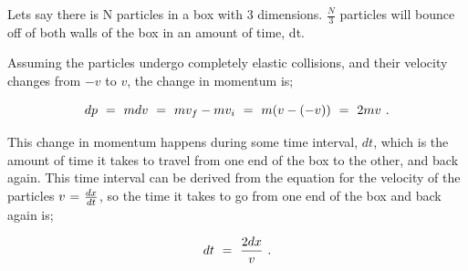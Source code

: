 \documentclass{article}
\begin{document}
Lets say there is N particles in a box with 3 dimensions. \begin{math} \frac{N}{3} \end{math} particles will bounce off of both walls of the box in an amount of time, dt. 

\vspace{0.25cm}

Assuming the particles undergo completely elastic collisions, and their velocity changes from \begin{math} -v \end{math} to \begin{math} v \end{math}, the change in momentum is;

\vspace{-0.25cm}

\begin{equation} \label{eb-eq-256-64}
dp \hspace{0.125cm} = \hspace{0.125cm} m dv \hspace{0.125cm} = \hspace{0.125cm} m v_f - m v_i \hspace{0.125cm} = \hspace{0.125cm} m (v - (-v)) \hspace{0.125cm} = \hspace{0.125cm} 2 m v \hspace{0.125cm} .
\end{equation}

This change in momentum happens during some time interval, \begin{math} dt \end{math}, which is the amount of time it takes to travel from one end of the box to the other, and back again. This time interval can be derived from the equation for the velocity of the particles \begin{math} v \hspace{0.025cm} = \hspace{0.025cm} \frac{d x}{d t} \end{math}, so the time it takes to go from one end of the box and back again is;

\begin{equation} \label{eb-eq-256-65}
dt \hspace{0.125cm} = \hspace{0.125cm} \frac{2 d x}{v} \hspace{0.125cm} .
\end{equation}
\end{document}
